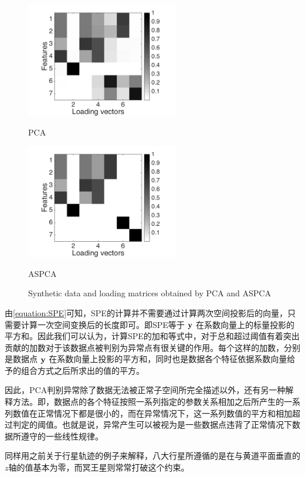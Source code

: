 \begin{figure}
\begin{minipage}{0.48\textwidth}
\centering
\includegraphics[height=50mm]{figure/new/Synthetic-Components-PCA}
\label{fig:pcs:PCA}
\caption{PCA}
\end{minipage}\hfill
\begin{minipage}{0.48\textwidth}
\centering
\includegraphics[height=50mm]{figure/new/Synthetic-Components-ASPCA-F}
\label{fig:pcs:ASPCA}
\caption{ASPCA}
\end{minipage}
\caption{Synthetic data and loading matrices obtained by PCA and ASPCA}
\label{fig:mappingmatrix}
\end{figure}

由\ref{equation:SPE}可知，SPE的计算并不需要通过计算两次空间投影后的向量，只需要计算一次空间变换后的长度即可。即SPE等于 ${\bf y}$ 在系数向量上的标量投影的平方和。因此我们可以认为，计算SPE的加和等式中，对于总和超过阈值有着突出贡献的加数对于该数据点被判别为异常点有很关键的作用。每个这样的加数，分别是数据点 ${\bf y}$ 在系数向量上投影的平方和，同时也是数据各个特征依据系数向量给予的组合方式之后所求出的值的平方。

因此，PCA判别异常除了数据无法被正常子空间所完全描述以外，还有另一种解释方法。即，数据点的各个特征按照一系列指定的参数关系相加之后所产生的一系列数值在正常情况下都是很小的，而在异常情况下，这一系列数值的平方和相加超过判定的阈值。也就是说，异常产生可以被视为是一些数据点违背了正常情况下数据所遵守的一些线性规律。

同样用之前关于行星轨迹的例子来解释，八大行星所遵循的是在与黄道平面垂直的$z$轴的值基本为零，而冥王星则常常打破这个约束。

